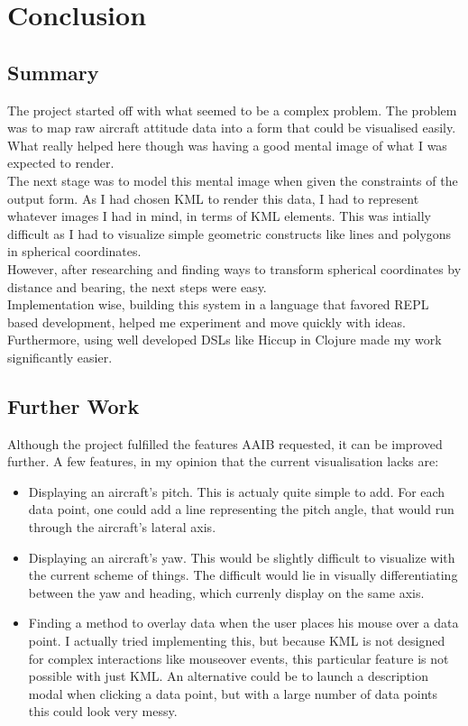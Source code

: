 \chapter{Conclusion}

\section{Summary}

The project started off with what seemed to be a complex problem. The problem was to map raw aircraft attitude data into a form that could be visualised easily. What really helped here though was having a good mental image of what I was expected to render. \\

The next stage was to model this mental image when given the constraints of the output form. As I had chosen KML to render this data, I had to represent whatever images I had in mind, in terms of KML elements. This was intially difficult as I had to visualize simple geometric constructs like lines and polygons in spherical coordinates. \\

However, after researching and finding ways to transform spherical coordinates by distance and bearing, the next steps were easy. \\

Implementation wise, building this system in a language that favored REPL based development, helped me experiment and move quickly with ideas. Furthermore, using well developed DSLs like Hiccup in Clojure made my work significantly easier. \\

\section{Further Work}

Although the project fulfilled the features AAIB requested, it can be improved further. A few features, in my opinion that the current visualisation lacks are:
\begin{itemize}
\item Displaying an aircraft's pitch. This is actualy quite simple to add. For each data point, one could add a line representing the pitch angle, that would run through the aircraft's lateral axis.
\item Displaying an aircraft's yaw. This would be slightly difficult to visualize with the current scheme of things. The difficult would lie in visually differentiating between the yaw and heading, which currenly display on the same axis.
\item Finding a method to overlay data when the user places his mouse over a data point. I actually tried implementing this, but because KML is not designed for complex interactions like mouseover events, this particular feature is not possible with just KML. An alternative could be to launch a description modal when clicking a data point, but with a large number of data points this could look very messy.
\end{itemize}
